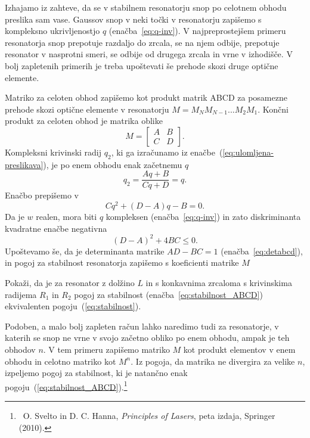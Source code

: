 Izhajamo iz zahteve, da se v stabilnem resonatorju snop po celotnem obhodu
preslika sam vase. Gaussov snop v neki točki v resonatorju 
zapišemo s kompleksno ukrivljenostjo $q$ (enačba~\ref{eq:q-inv}).
V najpreprostejšem primeru resonatorja snop prepotuje razdaljo do zrcala, se na njem 
odbije, prepotuje resonator v nasprotni smeri, se odbije od drugega zrcala in vrne 
v izhodišče. V bolj zapletenih primerih je treba upoštevati še 
prehode skozi druge optične elemente. 

Matriko 
za celoten obhod zapišemo kot produkt matrik ABCD za posamezne prehode skozi 
optične elemente v resonatorju $M = M_N M_{N-1} ...M_2 M_1$.
Končni produkt za celoten obhod je matrika oblike
\begin{equation}
M = \left[\begin{array}{cc}
A & B\\
C & D
\end{array}\right]\!.
\end{equation}
Kompleksni krivinski radij $q_2$, ki ga izračunamo iz enačbe~(\ref{eq:ulomljena-preslikava}), 
je po enem obhodu enak začetnemu $q$
\begin{equation}
q_2 = \frac{Aq+B}{Cq+D} = q.
\end{equation}
Enačbo prepišemo v 
\begin{equation}
Cq^2+(D-A)q-B=0.
\end{equation}
Da je $w$ realen, mora biti $q$ kompleksen (enačba~\ref{eq:q-inv}) 
in zato diskriminanta kvadratne enačbe negativna
\begin{equation}
(D-A)^2+ 4BC\leq 0.
\end{equation}
Upoštevamo še, da je determinanta matrike $AD-BC=1$ (enačba~\ref{eq:detabcd}), in pogoj za 
stabilnost resonatorja zapišemo s koeficienti matrike $M$

\begin{definition}
Pokaži, da je za resonator z dolžino $L$ in s konkavnima zrcaloma s krivinskima radijema $R_1$ in $R_2$ 
pogoj za stabilnost (enačba~\ref{eq:stabilnost_ABCD}) ekvivalenten pogoju~(\ref{eq:stabilnost}).
\end{definition}

\begin{remark}
Podoben, a malo bolj zapleten račun lahko naredimo tudi za resonatorje, v katerih se snop 
ne vrne v svojo začetno obliko po enem obhodu, ampak je teh obhodov $n$. V tem primeru zapišemo
matriko $M$ kot produkt elementov v enem obhodu in celotno matriko kot $M^n$. Iz pogoja,
da matrika ne divergira za velike $n$, izpeljemo pogoj za stabilnost, ki je natančno 
enak pogoju~(\ref{eq:stabilnost_ABCD}).\footnote{~O. Svelto in D. C. Hanna, 
{\it Principles of Lasers}, peta izdaja, Springer (2010).}
\end{remark}

